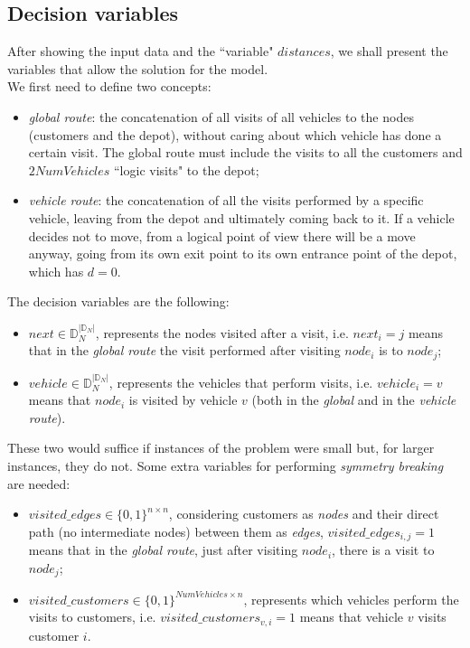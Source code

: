 \documentclass[../main.tex]{subfiles}
\begin{document}
\subsection{Decision variables}
After showing the input data and the ``variable" $distances$, we shall present the variables that allow the solution for the model.\\
We first need to define two concepts:
\begin{itemize}
    \item \textit{global route}: the concatenation of all visits of all vehicles to the nodes (customers and the depot), without caring about which vehicle has done a certain visit. The global route must include the visits to all the customers and $2NumVehicles$ ``logic visits" to the depot;
    \item \textit{vehicle route}: the concatenation of all the visits performed by a specific vehicle, leaving from the depot and ultimately coming back to it. If a vehicle decides not to move, from a logical point of view there will be a move anyway, going from its own exit point to its own entrance point of the depot, which has $d = 0$.
\end{itemize}
The decision variables are the following:
\begin{itemize}
    \item $next \in \mathbb{D}_N^{|\mathbb{D}_N|}$, represents the nodes visited after a visit, i.e. $next_i = j$ means that in the \textit{global route} the visit performed after visiting $node_i$ is to $node_j$;
    \item $vehicle \in \mathbb{D}_N^{|\mathbb{D}_N|}$, represents the vehicles that perform visits, i.e. $vehicle_i = v$ means that $node_i$ is visited by vehicle $v$ (both in the \textit{global} and in the \textit{vehicle route}).
\end{itemize}
These two would suffice if instances of the problem were small but, for larger instances, they do not. Some extra variables for performing \textit{symmetry breaking} are needed:
\begin{itemize}
    \item $visited\_edges \in \{0,1\}^{n\times{}n}$, considering customers as \textit{nodes} and their direct path (no intermediate nodes) between them as \textit{edges}, $visited\_edges_{i,j} = 1$ means that in the \textit{global route}, just after visiting $node_i$, there is a visit to $node_j$;
    \item $visited\_customers \in \{0,1\}^{NumVehicles\times{}n}$, represents which vehicles perform the visits to customers, i.e. $visited\_customers_{v,i} = 1$ means that vehicle $v$ visits customer $i$.
\end{itemize}
\end{document}
